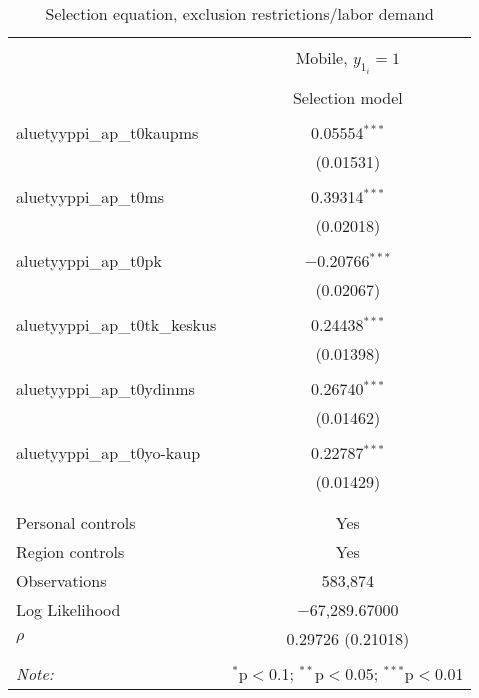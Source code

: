 
\begin{table}[!htbp] \centering 
  \caption{Selection equation, exclusion restrictions/labor demand} 
  \label{} 
\begin{tabular}{@{\extracolsep{5pt}}lc} 
\\[-1.8ex]\hline 
\hline \\[-1.8ex] 
 & \multicolumn{1}{c}{Mobile, $y_{1_i} = 1$} \\ 
\cline{2-2} 
\\[-1.8ex] & Selection model \\ 
\hline \\[-1.8ex] 
 aluetyyppi\_ap\_t0kaupms & 0.05554$^{***}$ \\ 
  & (0.01531) \\ 
  & \\ 
 aluetyyppi\_ap\_t0ms & 0.39314$^{***}$ \\ 
  & (0.02018) \\ 
  & \\ 
 aluetyyppi\_ap\_t0pk & $-$0.20766$^{***}$ \\ 
  & (0.02067) \\ 
  & \\ 
 aluetyyppi\_ap\_t0tk\_keskus & 0.24438$^{***}$ \\ 
  & (0.01398) \\ 
  & \\ 
 aluetyyppi\_ap\_t0ydinms & 0.26740$^{***}$ \\ 
  & (0.01462) \\ 
  & \\ 
 aluetyyppi\_ap\_t0yo-kaup & 0.22787$^{***}$ \\ 
  & (0.01429) \\ 
  & \\ 
\hline \\[-1.8ex] 
Personal controls & Yes \\ 
Region controls & Yes \\ 
Observations & 583,874 \\ 
Log Likelihood & $-$67,289.67000 \\ 
$\rho$ & 0.29726  (0.21018) \\ 
\hline 
\hline \\[-1.8ex] 
\textit{Note:}  & \multicolumn{1}{r}{$^{*}$p$<$0.1; $^{**}$p$<$0.05; $^{***}$p$<$0.01} \\ 
\end{tabular} 
\end{table} 
